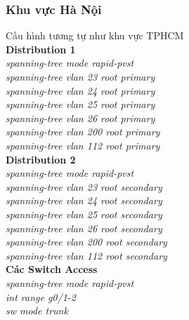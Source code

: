 \documentclass[12pt,a4paper]{report}
\begin{document}
\subsubsection{Khu vực Hà Nội}
\hspace*{1cm}Cấu hình tương tự như khu vực TPHCM\\
\hspace*{1cm}\textbf{Distribution 1}\\
\hspace*{2cm}\textit{spanning-tree mode rapid-pvst\\
\hspace*{2cm}spanning-tree vlan 23 root primary\\
\hspace*{2cm}spanning-tree vlan 24 root primary\\
\hspace*{2cm}spanning-tree vlan 25 root primary\\
\hspace*{2cm}spanning-tree vlan 26 root primary\\
\hspace*{2cm}spanning-tree vlan 200 root primary \\
\hspace*{2cm}spanning-tree vlan 112 root primary\\}
\hspace*{1cm}\textbf{Distribution 2}\\
\hspace*{2cm}\textit{spanning-tree mode rapid-pvst\\
\hspace*{2cm}spanning-tree vlan 23 root secondary\\
\hspace*{2cm}spanning-tree vlan 24 root secondary\\
\hspace*{2cm}spanning-tree vlan 25 root secondary\\
\hspace*{2cm}spanning-tree vlan 26 root secondary\\
\hspace*{2cm}spanning-tree vlan 200 root secondary\\
\hspace*{2cm}spanning-tree vlan 112 root secondary\\}
\hspace*{1cm}\textbf{Các Switch Access}\\
\hspace*{2cm}\textit{spanning-tree mode rapid-pvst\\
\hspace*{2cm}int range g0/1-2\\
\hspace*{2cm}sw mode trunk\\}
\end{document}
